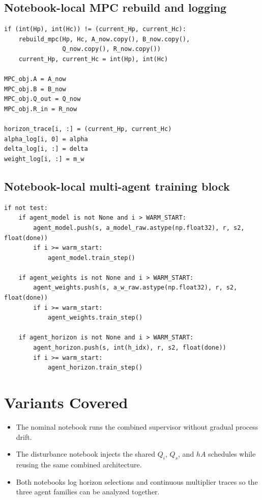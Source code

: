 \documentclass[11pt]{article}
\begin{document}
\subsection*{Notebook-local MPC rebuild and logging}

\begin{lstlisting}
if (int(Hp), int(Hc)) != (current_Hp, current_Hc):
    rebuild_mpc(Hp, Hc, A_now.copy(), B_now.copy(),
                Q_now.copy(), R_now.copy())
    current_Hp, current_Hc = int(Hp), int(Hc)

MPC_obj.A = A_now
MPC_obj.B = B_now
MPC_obj.Q_out = Q_now
MPC_obj.R_in = R_now

horizon_trace[i, :] = (current_Hp, current_Hc)
alpha_log[i, 0] = alpha
delta_log[i, :] = delta
weight_log[i, :] = m_w
\end{lstlisting}

\subsection*{Notebook-local multi-agent training block}

\begin{lstlisting}
if not test:
    if agent_model is not None and i > WARM_START:
        agent_model.push(s, a_model_raw.astype(np.float32), r, s2, float(done))
        if i >= warm_start:
            agent_model.train_step()

    if agent_weights is not None and i > WARM_START:
        agent_weights.push(s, a_w_raw.astype(np.float32), r, s2, float(done))
        if i >= warm_start:
            agent_weights.train_step()

    if agent_horizon is not None and i > WARM_START:
        agent_horizon.push(s, int(h_idx), r, s2, float(done))
        if i >= warm_start:
            agent_horizon.train_step()
\end{lstlisting}

\section*{Variants Covered}

\begin{itemize}
\item The nominal notebook runs the combined supervisor without gradual process
      drift.
\item The disturbance notebook injects the shared $Q_i$, $Q_s$, and $hA$
      schedules while reusing the same combined architecture.
\item Both notebooks log horizon selections and continuous multiplier traces so
      the three agent families can be analyzed together.
\end{itemize}
\end{document}
